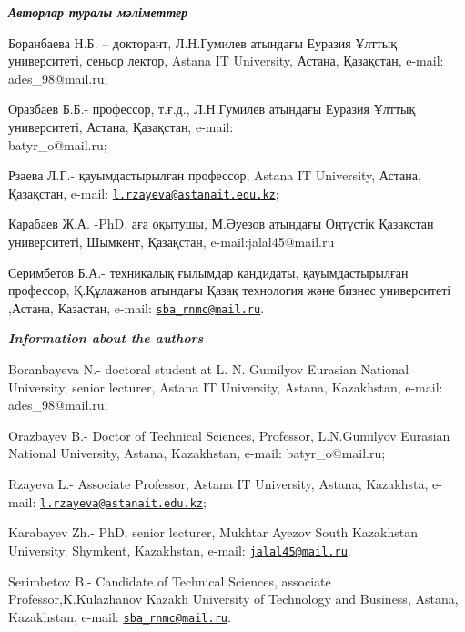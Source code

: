 \begin{authorinfo}
\hspace{1em}\emph{{\bfseries Авторлар туралы мәліметтер}}

Боранбаева Н.Б. -- докторант, Л.Н.Гумилев атындағы Еуразия Ұлттық
университеті, сеньор лектор, Astana IT University, Астана, Қазақстан,
e-mail: ades\_98@mail.ru;

Оразбаев Б.Б.- профессор, т.ғ.д., Л.Н.Гумилев атындағы Еуразия Ұлттық
университеті, Астана, Қазақстан, e-mail: \\batyr\_o@mail.ru;

Рзаева Л.Г.- қауымдастырылған профессор, Astana IT University, Астана,
Қазақстан, e-mail:
\href{mailto:l.rzayeva@astanait.edu.kz}{\nolinkurl{l.rzayeva@astanait.edu.kz}};

Карабаев Ж.А. -PhD, аға оқытушы, М.Әуезов атындағы Оңтүстік Қазақстан
университеті, Шымкент, Қазақстан, e-mail:jalal45@mail.ru

Серимбетов Б.А.- техникалық ғылымдар кандидаты, қауымдастырылған
профессор, Қ.Құлажанов атындағы Қазақ технология және бизнес
университеті ,Астана, Қазастан, e-mail:
\href{mailto:sba_rnmc@mail.ru}{\nolinkurl{sba\_rnmc@mail.ru}}.

\hspace{1em}\emph{{\bfseries Information about the authors}}

Boranbayeva N.- doctoral student at L. N. Gumilyov Eurasian National
University, senior lecturer, Astana IT University, Astana, Kazakhstan,
e-mail: ades\_98@mail.ru;

Orazbayev B.- Doctor of Technical Sciences, Professor, L.N.Gumilyov
Eurasian National University, Astana, Kazakhstan, e-mail:
batyr\_o@mail.ru;

Rzayeva L.- Associate Professor, Astana IT University, Astana,
Kazakhsta, e-mail:
\href{mailto:l.rzayeva@astanait.edu.kz}{\nolinkurl{l.rzayeva@astanait.edu.kz}};

Karabayev Zh.- PhD, senior lecturer, Mukhtar Ayezov South Kazakhstan
University, Shymkent, Kazakhstan, e-mail:
\href{mailto:jalal45@mail.ru}{\nolinkurl{jalal45@mail.ru}}.

Serimbetov B.- Candidate of Technical Sciences, associate
Professor,K.Kulazhanov Kazakh University of Technology and Business,
Astana, Kazakhstan, e-mail:
\href{mailto:sba_rnmc@mail.ru}{\nolinkurl{sba\_rnmc@mail.ru}}.
\end{authorinfo}
